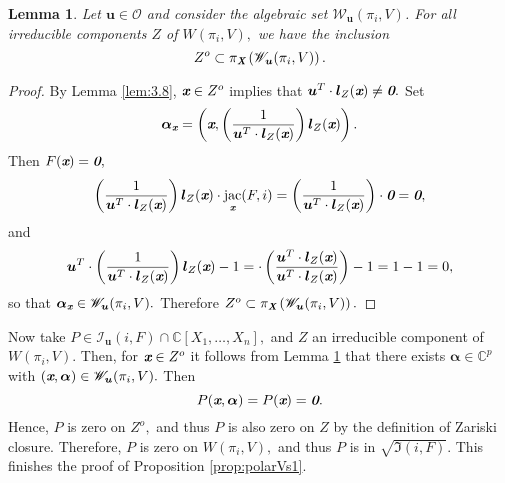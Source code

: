 \documentclass[a4paper]{article}
\def\bz{\textit{\textbf{0}}}
\def\Xb{\textit{\textbf{X}}}
\def\ub{{\bm u}}
\def\lb{{\bm l}}
\def\ax{\bm \alpha_{\xb}}
\def\xb{\textit{\textbf{x}}}
\DeclareMathOperator{\jac}{jac}
\def\C{\mathbb{C}}
\def\Wi{W(\pi_i,V)}
\def\Iir{\sqrt{\mathfrak{I}(i,F)}}
\def\ji{\jac_{\xb}(F,i)}
\def\Iil{\mathscr{I}_{\ub}(i,F)}
\def\Wil{\mathscr{W}_{\ub}(\pi_i,V)}
\newtheorem{lemma}[theorem]{Lemma}
\begin{document}
%
\begin{lemma}\label{lem:3.9}
Let $\ub \in \mathscr{O}$ and consider the algebraic set $\Wil$. For all irreducible components $Z$ of $\Wi,$ we have the inclusion \[Z^o \subset \pi_{\Xb}\left(\Wil\right).\]
\end{lemma}
%
\begin{proof}
By Lemma \ref{lem:3.8}, $\xb \in Z^o$ implies that $\ub^T \cdot \lb_{Z}(\xb) \not = \bz.$ Set
\[
\bm \alpha_{\xb} = \left(\xb,\left(\frac{1}{\ub^T\cdot \lb_{Z}(\xb)}\right)\lb_{Z}(\xb)\right). 
\]
Then $F(\xb)=\bz,$
\begin{align*}
    \left(\frac{1}{\ub^T\cdot \lb_{Z}(\xb)}\right)\lb_{Z}(\xb)\cdot \ji = \left(\frac{1}{\ub^T\cdot \lb_{Z}(\xb)}\right)\cdot \bz = \bz,
\end{align*}
and
\[
\ub^T\cdot\left(\frac{1}{\ub^T\cdot \lb_{Z}(\xb)}\right)\lb_{Z}(\xb)-1 =
    \cdot\left(\frac{\ub^T\cdot\lb_{Z}(\xb)}{\ub^T\cdot \lb_{Z}(\xb)}\right)-1=1-1=0,
\]
so that $\ax \in \Wil.$ Therefore $Z^o \subset \pi_{\Xb}\left(\Wil\right).$
%
\end{proof}
%
%
%
\noindent 
Now take $P \in \Iil\cap \C[X_1,\hdots,X_n],$ and $Z$ an irreducible component of $\Wi.$ Then, for $\xb \in Z^o$ it follows from Lemma \ref{lem:3.9} that there exists $\bm \alpha \in \C^p$ with $(\xb, \bm \alpha) \in \Wil.$ Then 
\[
P(\xb, \bm \alpha) = P(\xb) = \bz.
\]
Hence, $P$ is zero on $Z^o,$ and thus $P$ is also zero on $Z$ by the definition of Zariski closure. Therefore, $P$ is zero on $\Wi,$ and thus $P$ is in $\Iir.$ This finishes the proof of Proposition \ref{prop:polarVs1}. 

\noindent
\end{document}
